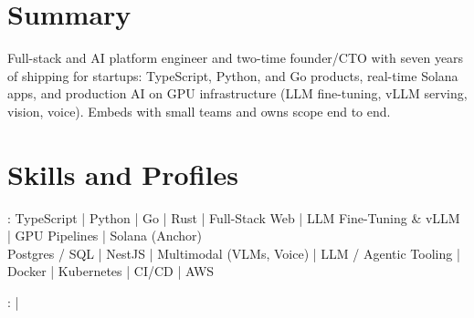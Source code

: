 \documentclass[print]{jack-resume}
\begin{document}
\pagecolor{darkmodeBackground}

%
%



\begin{minipage}[t][1cm][t]{.03\textwidth}
    \hfill
\end{minipage}


\section{Summary}
Full-stack and AI platform engineer and two-time founder/CTO with seven years of shipping for startups: TypeScript, Python, and Go products, real-time Solana apps, and production AI on GPU infrastructure (LLM fine-tuning, vLLM serving, vision, voice). Embeds with small teams and owns scope end to end.
\sectionsep


\section{Skills and Profiles}
:
TypeScript \hfill | \hfill
Python \hfill | \hfill
Go \hfill | \hfill
Rust \hfill | \hfill
Full-Stack Web \hfill | \hfill
LLM Fine-Tuning \& vLLM \hfill | \hfill
GPU Pipelines \hfill | \hfill
Solana (Anchor) \\
\hspace{1.0cm} Postgres / SQL \hfill | \hfill
NestJS \hfill | \hfill
Multimodal (VLMs, Voice) \hfill | \hfill
LLM / Agentic Tooling \hfill | \hfill
Docker \hfill | \hfill
Kubernetes \hfill | \hfill
CI/CD \hfill | \hfill
AWS \\

\raggedright{
    :
      \href{https://www.linkedin.com/in/jack-sturtevant/}{ \ExternalLink} |
     \href{https://github.com/jacksturt}{ \ExternalLink}}

\end{document}
